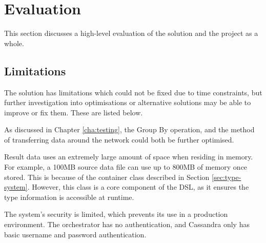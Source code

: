 \chapter{Evaluation}\label{cha:evaluation}
This section discusses a high-level evaluation of the solution and the project as a whole.

\section{Limitations}
The solution has limitations which could not be fixed due to time constraints, but further investigation into optimisations or alternative solutions may be able to improve or fix them. These are listed below.

As discussed in Chapter \ref{cha:testing}, the Group By operation, and the method of transferring data around the network could both be further optimised.



Result data uses an extremely large amount of space when residing in memory. For example, a 100MB source data file can use up to 800MB of memory once stored. This is because of the container class described in Section \ref{sec:type-system}. However, this class is a core component of the DSL, as it ensures the type information is accessible at runtime.

The system's security is limited, which prevents its use in a production environment. The orchestrator has no authentication, and Cassandra only has basic username and password authentication.

